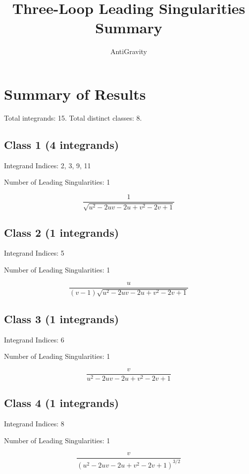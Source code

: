 \documentclass[11pt,a4paper]{article}
\title{Three-Loop Leading Singularities Summary}
\author{AntiGravity}
\begin{document}
\maketitle

\section{Summary of Results}
Total integrands: 15. Total distinct classes: 8.

\subsection*{Class 1 (4 integrands)}
Integrand Indices: 2, 3, 9, 11

Number of Leading Singularities: 1

\begin{equation}
\frac{1}{\sqrt{u^2-2 u v-2 u+v^2-2 v+1}}
\end{equation}


\subsection*{Class 2 (1 integrands)}
Integrand Indices: 5

Number of Leading Singularities: 1

\begin{equation}
\frac{u}{(v-1) \sqrt{u^2-2 u v-2 u+v^2-2 v+1}}
\end{equation}


\subsection*{Class 3 (1 integrands)}
Integrand Indices: 6

Number of Leading Singularities: 1

\begin{equation}
\frac{v}{u^2-2 u v-2 u+v^2-2 v+1}
\end{equation}


\subsection*{Class 4 (1 integrands)}
Integrand Indices: 8

Number of Leading Singularities: 1

\begin{equation}
\frac{v}{\left(u^2-2 u v-2 u+v^2-2 v+1\right)^{3/2}}
\end{equation}
\end{document}
